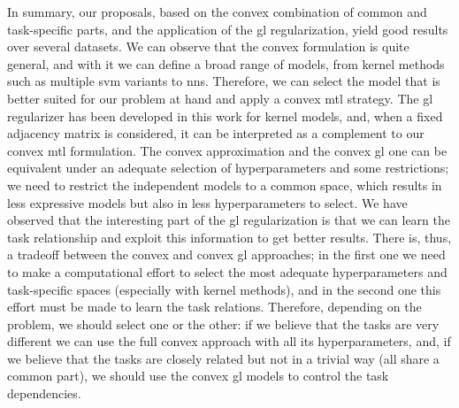 %
In summary, our proposals, based on the convex combination of common and task-specific parts, and the application of the \acrshort{gl} regularization, yield good results over several datasets. We can observe that the convex formulation is quite general, and with it we can define a broad range of models, from kernel methods such as multiple \acrshort{svm} variants to \acrshort{nns}. Therefore, we can select the model that is better suited for our problem at hand and apply a convex \acrshort{mtl} strategy.
%
The \acrshort{gl} regularizer has been developed in this work for kernel models, and, when a fixed adjacency matrix is considered, it can be interpreted as a complement to our convex \acrshort{mtl} formulation. The convex approximation and the convex \acrshort{gl} one can be equivalent under an adequate selection of hyperparameters and some restrictions; we need to restrict the independent models to a common space, which results in less expressive models but also in less hyperparameters to select. 
%
We have observed that the interesting part of the \acrshort{gl} regularization is that we can learn the task relationship and exploit this information to get better results.
%
There is, thus, a tradeoff between the convex and convex \acrshort{gl} approaches; in the first one we need to make a computational effort to select the most adequate hyperparameters and task-specific spaces (especially with kernel methods), and in the second one this effort must be made to learn the task relations.
Therefore, depending on the problem, we should select one or the other: if we believe that the tasks are very different we can use the full convex approach with all its hyperparameters, and, if we believe that the tasks are closely related but not in a trivial way (all share a common part), we should use the convex \acrshort{gl} models to control the task dependencies.
